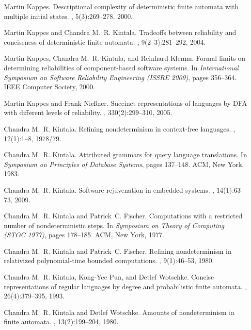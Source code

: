 \documentclass[copyright]{eptcs}
\begin{document}
\begin{thebibliography}{10}
Martin Kappes.
\newblock Descriptional complexity of deterministic finite automata with
  multiple initial states.
, 5(3):269--278, 2000.

Martin Kappes and Chandra M.~R. Kintala.
\newblock Tradeoffs between reliability and conciseness of deterministic finite
  automata.
, 9(2--3):281--292, 2004.

Martin Kappes, Chandra M.~R. Kintala, and Reinhard Klemm.
\newblock Formal limits on determining reliabilities of component-based
  software systems.
\newblock In {\em International Symposium on Software Reliability Engineering
  (ISSRE 2000)}, pages 356--364. IEEE Computer Society, 2000.

Martin Kappes and Frank Nie{\ss}ner.
\newblock Succinct representations of languages by {DFA} with different levels
  of reliability.
, 330(2):299--310, 2005.

Chandra M.~R. Kintala.
\newblock Refining nondeterminism in context-free languages.
, 12(1):1--8, 1978/79.

Chandra M.~R. Kintala.
\newblock Attributed grammars for query language translations.
\newblock In {\em Symposium on Principles of Database Systems}, pages 137--148.
  ACM, New York, 1983.

Chandra M.~R. Kintala.
\newblock Software rejuvenation in embedded systems.
, 14(1):63--73, 2009.

Chandra M.~R. Kintala and Patrick~C. Fischer.
\newblock Computations with a restricted number of nondeterministic steps.
\newblock In {\em {S}ymposium on {T}heory of {C}omputing (STOC 1977)}, pages
  178--185. ACM, New York, 1977.

Chandra M.~R. Kintala and Patrick~C. Fischer.
\newblock Refining nondeterminism in relativized polynomial-time bounded
  computations.
, 9(1):46--53, 1980.

Chandra M.~R. Kintala, Kong-Yee Pun, and Detlef Wotschke.
\newblock Concise representations of regular languages by degree and
  probabilistic finite automata.
, 26(4):379--395, 1993.

Chandra M.~R. Kintala and Detlef Wotschke.
\newblock Amounts of nondeterminism in finite automata.
, 13(2):199--204, 1980.


\end{thebibliography}
\end{document}
